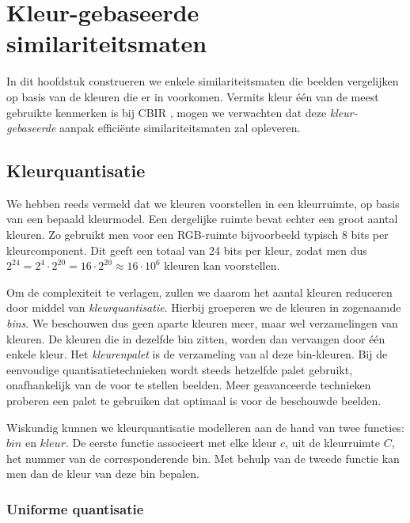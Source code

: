 \chapter{Kleur-gebaseerde similariteitsmaten}

In dit hoofdstuk construeren we enkele similariteitsmaten die beelden vergelijken op
basis van de kleuren die er in voorkomen. Vermits kleur \'e\'en van de meest gebruikte 
kenmerken is bij CBIR \cite{rui:image_retr}, mogen we verwachten dat deze \emph{kleur-gebaseerde}
aanpak effici\"ente similariteitsmaten zal opleveren.




\section{Kleurquantisatie}

We hebben reeds vermeld dat we kleuren voorstellen in een kleurruimte, op basis van een bepaald
kleurmodel. Een dergelijke ruimte bevat echter een groot aantal kleuren. Zo gebruikt men
voor een RGB-ruimte bijvoorbeeld typisch 8 bits per kleurcomponent. Dit geeft een totaal van
24 bits per kleur, zodat men dus $2^{24}=2^4 \cdot 2^{20}=16 \cdot 2^{20} \approx 16 \cdot 10^6$
kleuren kan voorstellen. 

Om de complexiteit te verlagen, zullen we daarom het aantal kleuren 
reduceren door middel van \emph{kleurquantisatie}. Hierbij groeperen we de kleuren in 
zogenaamde \emph{bins}. We beschouwen dus geen aparte kleuren meer, maar wel verzamelingen 
van kleuren. De kleuren die in dezelfde bin zitten, worden dan vervangen door \'e\'en enkele
kleur. Het \emph{kleurenpalet} is de verzameling van al deze bin-kleuren.
Bij de eenvoudige quantisatietechnieken
wordt steeds hetzelfde palet gebruikt, onafhankelijk van de voor te stellen beelden. Meer
geavanceerde technieken proberen een palet te gebruiken dat optimaal is voor de
beschouwde beelden.

Wiskundig kunnen we kleurquantisatie modelleren aan de hand van twee functies: $bin$ en
$kleur$. De eerste functie associeert met elke kleur $c$, uit de kleurruimte $C$, het
nummer van de corresponderende bin. Met behulp van de tweede functie kan men dan de kleur
van deze bin bepalen.  

\subsection{Uniforme quantisatie}

